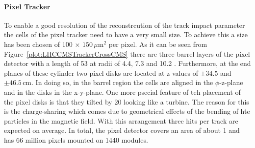 \paragraph{Pixel Tracker}
To enable a good resolution of the reconstrcution of the track impact parameter the cells of the pixel tracker need to have a very small size. To achieve this a size has been chosen of $\text{100}\,\times\,\text{150}\,\mu\text{m}^{\text{2}}$ per pixel. As it can be seen from Figure~\ref{plot:LHCCMSTrackerCrossCMS} there are three barrel layers of the pixel detector with a length of 53\cm{} at radii of 4.4, 7.3 and 10.2 \cm{}. Furthermore, at the end planes of these cylinder two pixel disks are located at z values of $\pm{}34.5$ and $\pm{}46.5\,\text{cm}$. In doing so, in the barrel region the cells are aligned in the $\phi{}$-z-plane and in the disks in the x-y-plane. One more psecial feature of teh placement of the pixel disks is that they tilted by 20\de{} looking like a turbine. The reason for this is the charge-sharing which comes due to geometrical effects of the bending of hte particles in the magnetic field.  With this arrangement three hits per track are expected on average. In total, the pixel detector covers an area of about 1\ms{} and has 66 million pixels mounted on 1440 modules.


